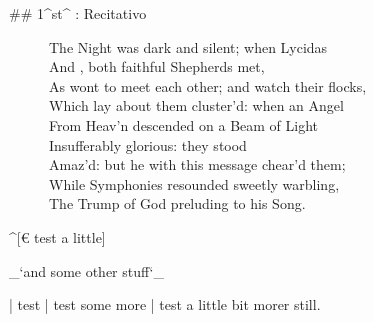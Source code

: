 \newpage
{}

## 1^st^ \mvmt: Recitativo


\begin{figure}[t]
\centering
\begin{minipage}[t]{0.5\textwidth}
\begin{linenumbers}
The Night was dark and silent; when Lycidas  \\
And , both faithful  Shepherds met,  \\
As wont to meet each other; and watch their flocks,  \\
Which lay about them cluster’d: when an Angel  \\
From Heav’n descended on a Beam of Light  \\
Insufferably glorious: they stood  \\
Amaz’d: but he with this message chear’d them;  \\
While Symphonies resounded sweetly warbling,  \\
The Trump of God preluding to his Song.
\end{linenumbers}
\end{minipage}
\end{figure}

^[€ test a little]

_`and some other stuff`_

| test
| test some more
| test a little bit morer still.

